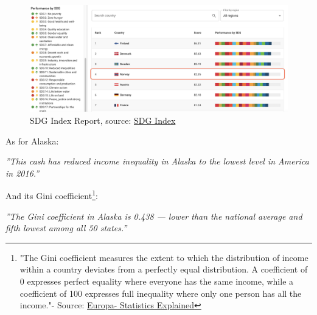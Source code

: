 \begin{enumerate}
    \begin{figure}[htbp]
	   \centering
	   \includegraphics[scale=0.3]{figures/sdg.png}  %
	   \caption{SDG Index Report, source: \href{https://dashboards.sdgindex.org/rankings}{SDG Index}}
	   \label{fig:sdg}
    \end{figure}

As for Alaska:

\begin{flushright}
   \textsl{''This cash has reduced income inequality in Alaska to the lowest level in America in 2016.'' \cite{huffpost}} \\
\end{flushright}

And its Gini coefficient\footnote{"The Gini coefficient measures the extent to which the distribution of income within a country deviates from a perfectly equal distribution. A coefficient of 0 expresses perfect equality where everyone has the same income, while a coefficient of 100 expresses full inequality where only one person has all the income."- Source: \href{https://ec.europa.eu/eurostat/statistics-explained/index.php?title=Glossary:Gini_coefficient}{Europa- Statistics Explained}}:

\begin{flushright}
   \textsl{''The Gini coefficient in Alaska is 0.438 — lower than the national average and fifth lowest among all 50 states.'' \cite{247}} \\

\end{flushright}


\end{enumerate}
